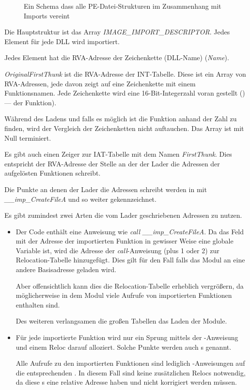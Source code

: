 \begin{figure}[H]
\centering
{}
\caption{
Ein Schema dass alle PE-Datei-Strukturen im Zusammenhang mit Imports vereint}
\end{figure}

Die Hauptstruktur ist das Array \emph{IMAGE\_IMPORT\_DESCRIPTOR}. Jedes Element für
jede DLL wird importiert.

Jedes Element hat die \ac{RVA}-Adresse der Zeichenkette (DLL-Name) (\emph{Name}).

\emph{OriginalFirstThunk} ist die \ac{RVA}-Adresse der \ac{INT}-Tabelle. Diese ist
ein Array von \ac{RVA}-Adressen, jede davon zeigt auf eine Zeichenkette mit einem
Funktionsnamen. Jede Zeichenkette wird eine 16-Bit-Integerzahl voran gestellt
()--- der Funktion).

Während des Ladens und falls es möglich ist die Funktion anhand der Zahl zu finden,
wird der Vergleich der Zeichenketten nicht auftauchen. Das Array ist mit Null terminiert.

Es gibt auch einen Zeiger zur \ac{IAT}-Tabelle mit dem Namen \emph{FirstThunk}. Dies
entspricht der \ac{RVA}-Adresse der Stelle an der der Lader die Adressen der aufgelösten
Funktionen schreibt.

Die Punkte an denen der Lader die Adressen schreibt werden in \IDA mit \emph{\_\_imp\_CreateFileA}
und so weiter gekennzeichnet.

Es gibt zumindest zwei Arten die vom Lader geschriebenen Adressen zu nutzen.

\begin{itemize}
\item Der Code enthält eine Anweisung wie \emph{call \_\_imp\_CreateFileA}. Da das Feld
mit der Adresse der importierten Funktion in gewisser Weise eine globale Variable
ist, wird die Adresse der \emph{call}-Anweisung (plus 1 oder 2) zur Relocation-Tabelle
hinzugefügt. Dies gilt für den Fall falls das Modul an eine andere Basisadresse
geladen wird.

Aber offensichtlich kann dies die Relocation-Tabelle erheblich vergrößern, da
möglicherweise in dem Modul viele Aufrufe von importierten Funktionen enthalten sind.

Des weiteren verlangsamen die großen Tabellen das Laden der Module.

\item Für jede importierte Funktion wird nur ein Sprung mittels der \JMP-Anweisung
und einem Reloc darauf alloziert.
Solche Punkte werden auch s genannt.

Alle Aufrufe zu den importierten Funktionen sind lediglich \CALL-Anweisungen auf
die entsprechenden .
In diesem Fall sind keine zusätzlichen Relocs notwendig, da diese \CALL{}s eine
relative Adresse haben und nicht korrigiert werden müssen.
\end{itemize}

